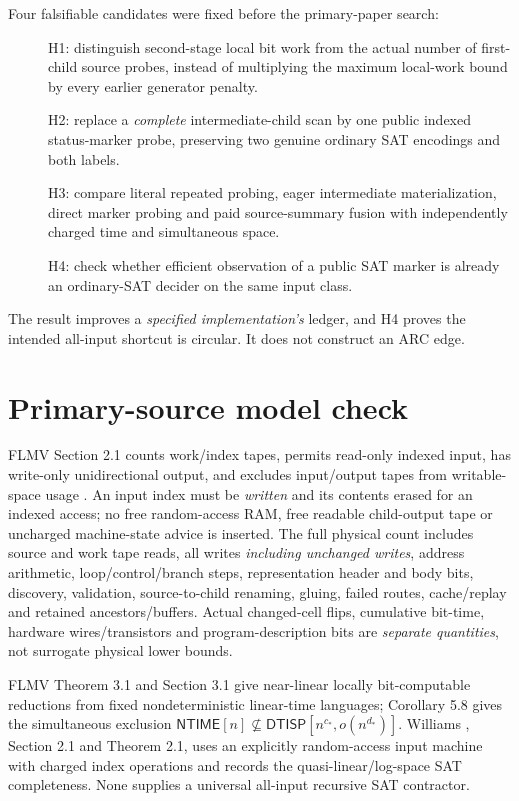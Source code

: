 \documentclass[11pt]{article}
\newcommand{\NTIME}{\mathsf{NTIME}}
\newcommand{\DTISP}{\mathsf{DTISP}}
\begin{document}
Four falsifiable candidates were fixed before the primary-paper search:
\begin{description}
\item[] H1: distinguish second-stage local bit work from the actual
number of first-child source probes, instead of multiplying the
maximum local-work bound by every earlier generator penalty.
\item[] H2: replace a \emph{complete} intermediate-child scan by one
public indexed status-marker probe, preserving two genuine ordinary
SAT encodings and both labels.
\item[] H3: compare literal repeated probing, eager intermediate
materialization, direct marker probing and paid source-summary fusion
with independently charged time and simultaneous space.
\item[] H4: check whether efficient observation of a public SAT marker
is already an ordinary-SAT decider on the same input class.
\end{description}
The result improves a \emph{specified implementation's} ledger,
and H4 proves the intended all-input shortcut is circular.
It does not construct an ARC edge.

\section{Primary-source model check}
FLMV Section 2.1 counts work/index tapes, permits read-only
indexed input, has write-only unidirectional output, and
excludes input/output tapes from writable-space usage
\cite{FLMV}. An input index must be \emph{written} and its contents
erased for an indexed access; no free random-access RAM, free
readable child-output tape or uncharged machine-state advice
is inserted. The full physical count includes source and work
tape reads, all writes \emph{including unchanged writes},
address arithmetic, loop/control/branch steps, representation
header and body bits, discovery, validation, source-to-child
renaming, gluing, failed routes, cache/replay and retained
ancestors/buffers. Actual changed-cell flips, cumulative bit-time,
hardware wires/transistors and program-description bits are
\emph{separate quantities}, not surrogate physical lower bounds.

FLMV Theorem 3.1 and Section 3.1 give near-linear locally
bit-computable reductions from fixed nondeterministic linear-time
languages; Corollary 5.8 gives the simultaneous exclusion
\(\NTIME[n]\not\subseteq
\DTISP[n^{c_*},o(n^{d_*})]\).
Williams \cite{Williams}, Section 2.1 and Theorem 2.1,
uses an explicitly random-access input machine with charged
index operations and records the quasi-linear/log-space
SAT completeness. None supplies a universal all-input
recursive SAT contractor.
\end{document}
